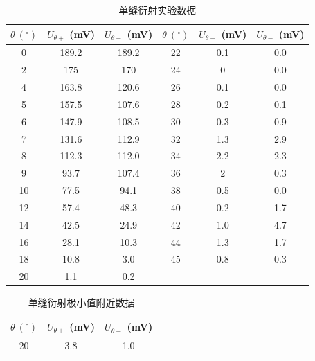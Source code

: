 \documentclass[UTF8]{article}
\theoremstyle{MyLineTheoremStyle} %
\theoremstyle{MyBlockTheoremStyle} %
\theoremstyle{MySubsubsectionStyle} %
\begin{document}
\begin{center}
\noindent\begin{minipage}{0.65\columnwidth}
\begin{table}[H]\centering
    \caption{单缝衍射实验数据}
    \label{单缝衍射实验数据}
    \begin{tabular}{cccccc}\toprule
        $\theta \ \mathrm{(^\circ)}$  & $U_{\theta+}$ (mV) & $U_{\theta-}$ (mV) & $\theta \ \mathrm{(^\circ)}$  & $U_{\theta+}$ (mV) & $U_{\theta-}$ (mV) \\
        \midrule
        0	&189.2	&189.2 & 22	&0.1	&0.0 \\
        2	&175	&170   & 24	&0	    &0.0 \\
        4	&163.8	&120.6 & 26	&0.1	&0.0 \\
        5	&157.5	&107.6 & 28	&0.2	&0.1 \\
        6	&147.9	&108.5 & 30	&0.3	&0.9 \\
        7	&131.6	&112.9 & 32	&1.3	&2.9 \\
        8	&112.3	&112.0 & 34	&2.2	&2.3 \\
        9	&93.7	&107.4 & 36	&2	    &0.3 \\
        10	&77.5	&94.1  & 38	&0.5	&0.0 \\
        12	&57.4	&48.3  & 40	&0.2	&1.7 \\
        14	&42.5	&24.9  & 42	&1.0	&4.7 \\
        16	&28.1	&10.3  & 44	&1.3	&1.7 \\
        18	&10.8	&3.0   & 45	&0.8	&0.3 \\
        20	&1.1	&0.2   &    &       &    \\
        \bottomrule
    \end{tabular}
\end{table}
\end{minipage}\hfill\begin{minipage}{0.35\columnwidth}
    \begin{table}[H]\centering
        \caption{单缝衍射极小值附近数据}
        \label{单缝衍射极小值附近数据}
    \begin{tabular}{ccc}\toprule
        $\theta \ \mathrm{(^\circ)}$ & $U_{\theta+}$ (mV) & $U_{\theta-}$ (mV) \\ 
        \midrule
        20	&3.8	&1.0 \\

\end{tabular}
\end{table}
\end{minipage}
\end{center}
\end{document}

